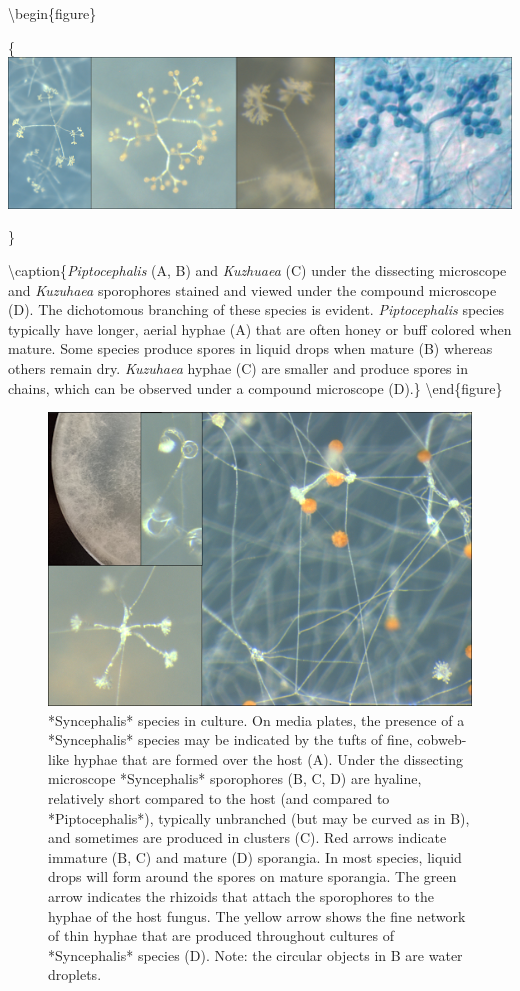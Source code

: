\documentclass[]{book}
\begin{document}
\textbackslash begin\{figure\}

\{\centering \includegraphics[width=6.83in]{img/Ch2_Fig5}

\}

\textbackslash caption\{\emph{Piptocephalis} (A, B) and \emph{Kuzhuaea} (C) under the dissecting microscope and \emph{Kuzuhaea} sporophores stained and viewed under the compound microscope (D). The dichotomous branching of these species is evident. \emph{Piptocephalis} species typically have longer, aerial hyphae (A) that are often honey or buff colored when mature. Some species produce spores in liquid drops when mature (B) whereas others remain dry. \emph{Kuzuhaea} hyphae (C) are smaller and produce spores in chains, which can be observed under a compound microscope (D).\}\label{fig:ch2fig5}
\textbackslash end\{figure\}

\begin{figure}

{\centering \includegraphics[width=6.83in]{img/Ch2_Fig6} 

}

\caption{*Syncephalis* species in culture.  On media plates, the presence of a *Syncephalis* species may be indicated by the tufts of fine, cobweb-like hyphae that are formed over the host (A).  Under the dissecting microscope *Syncephalis* sporophores (B, C, D) are hyaline, relatively short compared to the host (and compared to *Piptocephalis*), typically unbranched (but may be curved as in B), and sometimes are produced in clusters (C).  Red arrows indicate immature (B, C) and mature (D) sporangia.  In most species, liquid drops will form around the spores on mature sporangia.  The green arrow indicates the rhizoids that attach the sporophores to the hyphae of the host fungus.  The yellow arrow shows the fine network of thin hyphae that are produced throughout cultures of *Syncephalis* species (D).  Note: the circular objects in B are water droplets.}\label{fig:ch2fig6}
\end{figure}
\end{document}
